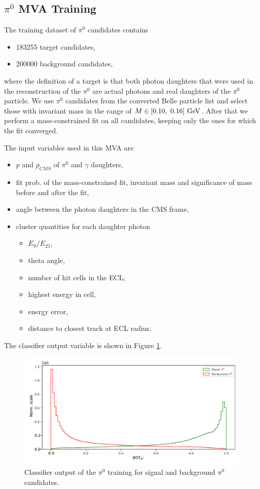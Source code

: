 \subsection{$\pi^0$ MVA Training}

The training dataset of $\pi^0$ candidates contains
\begin{itemize}
	\item 183255 target candidates,
	\item 200000 background candidates,
\end{itemize}
where the definition of a target is that both photon daughters that were used in the reconstruction of the $\pi^0$ are actual photons and real daughters of the $\pi^0$ particle. We use $\pi^0$ candidates from the converted Belle particle list and select those with invariant mass in the range of $M \in [0.10,~0.16]\mathrm{~GeV}$. After that we perform a mass-constrained fit on all candidates, keeping only the ones for which the fit converged. 

The input variables used in this MVA are
\begin{itemize}
	\item $p$ and $p_{CMS}$ of $\pi^0$ and $\gamma$ daughters,
	\item fit prob. of the mass-constrained fit, invariant mass and significance of mass before and after the fit,
	\item angle between the photon daughters in the CMS frame,
	\item cluster quantities for each daughter photon
	\begin{itemize}
		\item $E_9/E_{25}$,
		\item theta angle,
		\item number of hit cells in the ECL,
		\item highest energy in cell,
		\item energy error,
		\item distance to closest track at ECL radius.
	\end{itemize}
\end{itemize}

The classifier output variable is shown in Figure \ref{fig:ROE_pi0}.

\begin{figure}[H]
	\centering
	\captionsetup{width=0.8\linewidth}
	\includegraphics[width=\linewidth]{fig/ROECleanup_pi0}
	\caption{Classifier output of the $\pi^0$ training for signal and background $\pi^0$ candidates.}
	\label{fig:ROE_pi0}
\end{figure}

